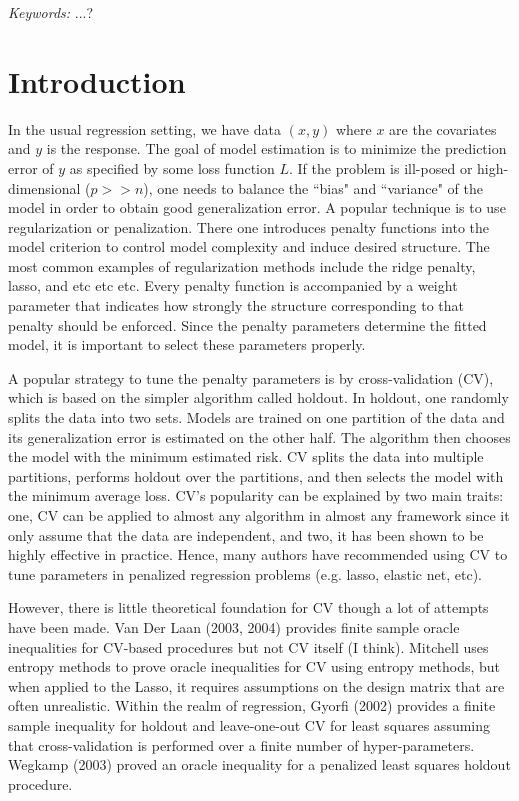 \documentclass[12pt]{article}
\begin{document}
\noindent%
{\it Keywords:}  ...?
\vfill

\newpage
{} %
\section{Introduction}

In the usual regression setting, we have data $(x,y)$ where $x$ are the covariates and $y$ is the response. The goal of model estimation is to minimize the prediction error of $y$ as specified by some loss function $L$. If the problem is ill-posed or high-dimensional ($p >> n$), one needs to balance the ``bias" and ``variance" of the model in order to obtain good generalization error. A popular technique is to use regularization or penalization. There one introduces penalty functions into the model criterion to control model complexity and induce desired structure. The most common examples of regularization methods include the ridge penalty, lasso, and etc etc etc. Every penalty function is accompanied by a weight parameter that indicates how strongly the structure corresponding to that penalty should be enforced. Since the penalty parameters determine the fitted model, it is important to select these parameters properly.

A popular strategy to tune the penalty parameters is by cross-validation (CV), which is based on the simpler algorithm called holdout. In holdout, one randomly splits the data into two sets. Models are trained on one partition of the data and its generalization error is estimated on the other half. The algorithm then chooses the model with the minimum estimated risk. CV splits the data into multiple partitions, performs holdout over the partitions, and then selects the model with the minimum average loss. CV's popularity can be explained by two main traits: one, CV can be applied to almost any algorithm in almost any framework since it only assume that the data are independent, and two, it has been shown to be highly effective in practice. Hence, many authors have recommended using CV to tune parameters in penalized regression problems (e.g. lasso, elastic net, etc).

However, there is little theoretical foundation for CV though a lot of attempts have been made. Van Der Laan (2003, 2004) provides finite sample oracle inequalities for CV-based procedures but not CV itself (I think). Mitchell uses entropy methods to prove oracle inequalities for CV using entropy methods, but when applied to the Lasso, it requires assumptions on the design matrix that are often unrealistic. Within the realm of regression, Gyorfi (2002) provides a finite sample inequality for holdout and leave-one-out CV for least squares assuming that cross-validation is performed over a finite number of hyper-parameters. Wegkamp (2003) proved an oracle inequality for a penalized least squares holdout procedure. 
\end{document}
